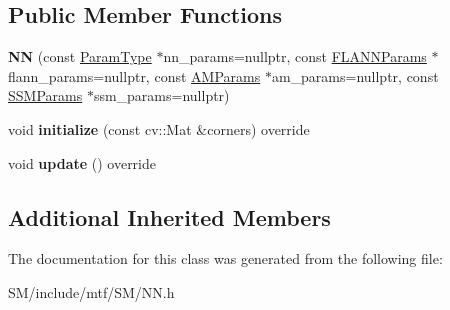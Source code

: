 \subsection*{Public Member Functions}
\begin{DoxyCompactItemize}
\item 
\hypertarget{classNN_af7cd2ad83a7ea51a5b72f6b11ffb4a1f}{{\bfseries N\-N} (const \hyperlink{structNNParams}{Param\-Type} $\ast$nn\-\_\-params=nullptr, const \hyperlink{structFLANNParams}{F\-L\-A\-N\-N\-Params} $\ast$flann\-\_\-params=nullptr, const \hyperlink{structAMParams}{A\-M\-Params} $\ast$am\-\_\-params=nullptr, const \hyperlink{structSSMParams}{S\-S\-M\-Params} $\ast$ssm\-\_\-params=nullptr)}\label{classNN_af7cd2ad83a7ea51a5b72f6b11ffb4a1f}

\item 
\hypertarget{classNN_a6cea91ca1c59726047e14dccc45db6eb}{void {\bfseries initialize} (const cv\-::\-Mat \&corners) override}\label{classNN_a6cea91ca1c59726047e14dccc45db6eb}

\item 
\hypertarget{classNN_a91a92f2195b0a565ffda38038c35659b}{void {\bfseries update} () override}\label{classNN_a91a92f2195b0a565ffda38038c35659b}

\end{DoxyCompactItemize}
\subsection*{Additional Inherited Members}


The documentation for this class was generated from the following file\-:\begin{DoxyCompactItemize}
\item 
S\-M/include/mtf/\-S\-M/N\-N.\-h\end{DoxyCompactItemize}
